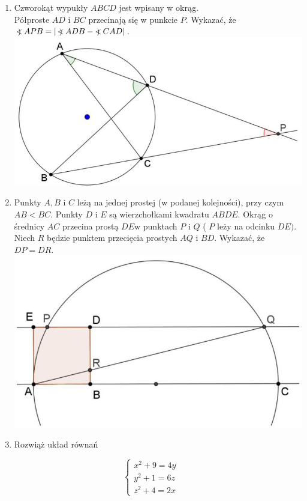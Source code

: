 \documentclass[10pt]{article}
\newcommand\Varangle{\mathop{{<\!\!\!\!\!\text{\small)}}\:}\nolimits}
\begin{document}
\begin{enumerate}
  \item Czworokąt wypukły \(A B C D\) jest wpisany w okrąg.\\
Półproste \(A D\) i \(B C\) przecinają się w punkcie \(P\). Wykazać, że \(\Varangle A P B=|\Varangle A D B-\Varangle C A D|\).\\
\includegraphics[max width=\textwidth, center]{2024_11_21_beb13eed4633d22d0b6ag-1}
  \item Punkty \(A, B\) i \(C\) leżą na jednej prostej (w podanej kolejności), przy czym \(A B<B C\). Punkty \(D\) i \(E\) są wierzchołkami kwadratu \(A B D E\). Okrąg o średnicy \(A C\) przecina prostą \(D E \mathrm{w}\) punktach \(P\) i \(Q\) ( \(P\) leży na odcinku \(D E)\). Niech \(R\) będzie punktem przecięcia prostych \(A Q\) i \(B D\). Wykazać, że \(D P=D R\).\\
\includegraphics[max width=\textwidth, center]{2024_11_21_beb13eed4633d22d0b6ag-1(1)}
  \item Rozwiąż układ równań
\end{enumerate}

\[
\left\{\begin{array}{l}
x^{2}+9=4 y \\
y^{2}+1=6 z \\
z^{2}+4=2 x
\end{array}\right.
\]
\end{document}
